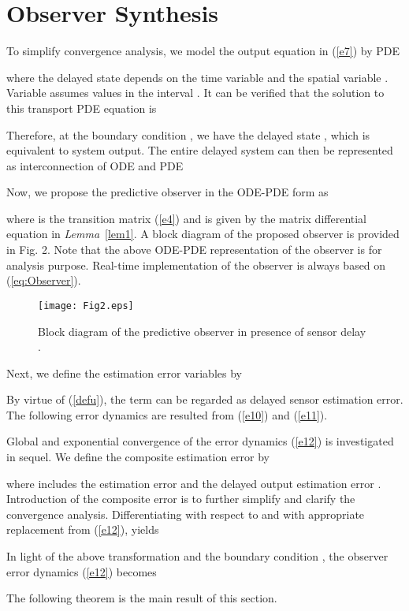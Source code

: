 \documentclass[12pt,draftcls,onecolumn]{IEEEtran}
\begin{document}
\section{Observer Synthesis}

To simplify convergence analysis, we model the output equation in (\ref{e7}) by PDE

where the delayed state  depends on the time variable  and the spatial variable . Variable  assumes values in the interval .
It can be verified that the solution to this transport PDE equation is

Therefore, at the boundary condition , we have the delayed state , which is equivalent to system output.
The entire delayed system can then be represented as interconnection of ODE and PDE

Now, we propose the predictive observer in the ODE-PDE form as

where  is the transition matrix (\ref{e4}) and  is given by the matrix differential equation in \textit{Lemma}~\ref{lem1}. A block diagram of the proposed observer is provided in Fig. 2. Note that the above ODE-PDE representation of the observer is for analysis purpose. Real-time implementation of the observer is always based on (\ref{eq:Observer}).
\begin{figure}[thpb] \label{F2}
\centering
\texttt{[image: Fig2.eps]}
\caption{Block diagram of the predictive observer in presence of sensor delay .}
\end{figure}

Next, we define the estimation error variables by


By virtue of (\ref{defu}), the term  can be regarded as delayed sensor estimation error.
The following error dynamics are resulted from (\ref{e10}) and (\ref{e11}).

Global and exponential convergence of the error dynamics (\ref{e12}) is investigated in sequel.
We define the composite estimation error by \cite{c16}

where  includes the estimation error  and the delayed output estimation error . Introduction of the composite error is to further simplify and clarify the convergence analysis.
Differentiating  with respect to  and  with appropriate replacement from (\ref{e12}), yields

In light of the above transformation and the boundary condition , the observer error dynamics (\ref{e12}) becomes

The following theorem is the main result of this section.
\end{document}
